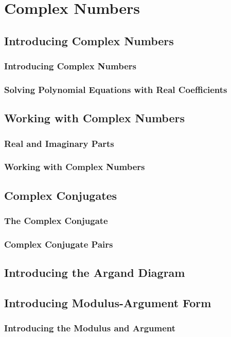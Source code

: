 \documentclass[../maths.tex]{subfiles}
\begin{document}
\chapter{Complex Numbers}
\section{Introducing Complex Numbers}
\subsection*{Introducing Complex Numbers}
\subsection*{Solving Polynomial Equations with Real Coefficients}
\section{Working with Complex Numbers}
\subsection*{Real and Imaginary Parts}
\subsection*{Working with Complex Numbers}
\section{Complex Conjugates}
\subsection*{The Complex Conjugate}
\subsection*{Complex Conjugate Pairs}
\section{Introducing the Argand Diagram}
\section{Introducing Modulus-Argument Form}
\subsection*{Introducing the Modulus and Argument}
\end{document}
